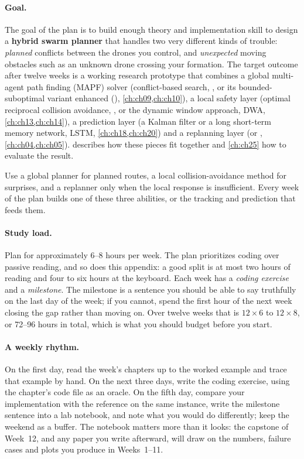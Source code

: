 \paragraph{Goal.}
The goal of the plan is to build enough theory and implementation skill to design a
\textbf{hybrid swarm planner} that handles two very
different kinds of trouble: \emph{planned} conflicts between the drones you control, and
\emph{unexpected} moving obstacles such as an unknown drone crossing your formation. The
target outcome after twelve weeks is a working research prototype that combines a global
multi-agent path finding (MAPF) solver (conflict-based search, \cbs, or its
bounded-suboptimal variant enhanced \cbs (\ecbs), \cref{ch:ch09,ch:ch10}), a local safety layer
(optimal reciprocal collision avoidance, \orca, or the dynamic window approach, DWA,
\cref{ch:ch13,ch:ch14}), a prediction layer (a Kalman filter or a long short-term memory
network, LSTM, \cref{ch:ch18,ch:ch20}) and a replanning layer (\dstarlite or \astar,
\cref{ch:ch04,ch:ch05}).  describes how these pieces fit together and
\cref{ch:ch25} how to evaluate the result.

\begin{keyidea}
Use a global planner for planned routes, a local collision-avoidance method for surprises,
and a replanner only when the local response is insufficient. Every week of the plan builds
one of these three abilities, or the tracking and prediction that feeds them.
\end{keyidea}

\paragraph{Study load.}
Plan for approximately 6--8 hours per week. The plan prioritizes coding over passive
reading, and so does this appendix: a good split is at most two hours of reading and four
to six hours at the keyboard. Each week has a \emph{coding exercise} and a \emph{milestone}.
The milestone is a sentence you should be able to say truthfully on the last day of the
week; if you cannot, spend the first hour of the next week closing the gap rather than
moving on. Over twelve weeks that is $12 \times 6$ to $12 \times 8$, or 72--96 hours in total, which is what you
should budget before you start.

\paragraph{A weekly rhythm.}
On the first day, read the week's chapters up to the worked example and trace that example
by hand. On the next three days, write the coding exercise, using the chapter's code file as
an oracle. On the fifth day, compare your implementation with the reference on the same
instance, write the milestone sentence into a lab notebook, and note what you would do
differently; keep the weekend as a buffer. The notebook matters more than it looks: the
capstone of Week~12, and any paper you write afterward, will draw on the numbers, failure
cases and plots you produce in Weeks~1--11.

